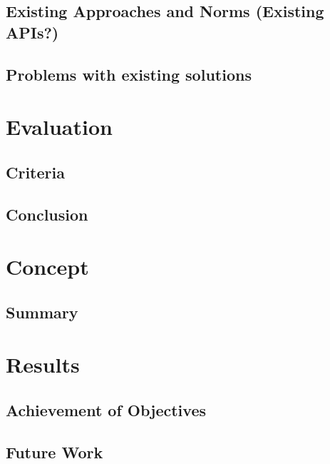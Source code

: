 \documentclass[a4paper,parskip=full]{scrreprt}
\begin{document}
\section{Existing Approaches and Norms (Existing APIs?)}
\section{Problems with existing solutions}  

\chapter{Evaluation}
\section{Criteria}
\section{Conclusion}

\chapter{Concept}
\section{Summary}

\chapter{Results}
\section{Achievement of Objectives}
\section{Future Work}
\end{document}
